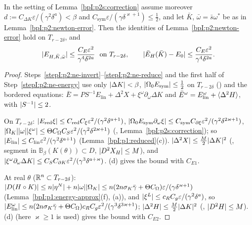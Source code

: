\begin{lemma}\label{bpI:p2s:newton-error}
In the setting of Lemma~\ref{bpI:p2s:correction} assume moreover $d:=C_{\Delta K}\varepsilon/(\gamma^2\delta^a)<\beta$ and
$C_{\mathrm{sym}}\varepsilon/(\gamma\delta^{\varkappa+1})\le\frac12$, and let $\bar K$, $\bar\omega=\bar s\omega^*$ be as in Lemma~\ref{bpI:p2:newton-error}. Then the
identities of Lemma~\ref{bpI:p2:newton-error} hold on $T_{r-2\delta}$, and
\[
\lvert E_{H,\bar K,\bar\omega}\rvert\le\frac{C_E\varepsilon^2}{\gamma^4\delta^{2a}}\ \text{ on }T_{r-2\delta},\qquad\lvert \bar E_H(\bar K)-E_0\rvert\le\frac{C_E\varepsilon^2}{\gamma^4\delta^{2a}}.
\]
\end{lemma}

\begin{proof}
\label{stepI:p2s:ne-id}
Steps~\ref{stepI:p2:ne-invert}--\ref{stepI:p2:ne-reduce} and the first half of Step~\ref{stepI:p2:ne-energy} use only $\lvert \Delta K\rvert<\beta$,
$\lvert \Omega_0E_{\mathrm{sym}}\rvert\le\frac12$ on $T_{r-2\delta}$ () and the bordered equations: $\bar E=PS^{-1}E_{\mathrm{lin}}+\Delta^2X+\xi^\omega
\partial_\omega\Delta K$ and $\bar E^\omega=E^\omega_{\mathrm{lin}}+\langle \Delta^2H\rangle$, with $\lvert S^{-1}\rvert\le2$.

\label{stepI:p2s:ne-e}
On $T_{r-2\delta}$: $\lvert E_{\mathrm{red}}\xi\rvert\le C_{\mathrm{red}}C_\xi\varepsilon^2/(\gamma^2\delta^{a+1})$, $\lvert \Omega_0E_{\mathrm{sym}}\partial_\omega\xi\rvert\le
C_{\mathrm{sym}}C_{\partial\xi}\varepsilon^2/(\gamma^2\delta^{2\varkappa+1})$, $\lvert \Omega_K\rvert\lvert \omega\rvert\lvert \xi^\omega\rvert\le\Theta C_\Omega C_S\varepsilon^2/(\gamma^2\delta^{2\varkappa+1})$
(, Lemma~\ref{bpI:p2s:correction}); so $\lvert E_{\mathrm{lin}}\rvert\le C_{\mathrm{lin}}\varepsilon^2/(\gamma^2\delta^{a+1})$ (Lemma~\ref{bpI:p1:reduced}(c)).
$\lvert \Delta^2X\rvert\le\frac M2\lvert \Delta K\rvert^2$ (, segment in $\mathbb B_\beta(K(\theta))\subset D$, $\lvert D^2X_H\rvert\le M$), and
$\lvert \xi^\omega\partial_\omega\Delta K\rvert\le C_SC_{\partial K}\varepsilon^2/(\gamma^3\delta^{a+\varkappa})$. (d) gives the bound with $C_{E1}$.

\label{stepI:p2s:ne-en}
At real $\theta$ ($\mathbb{R}^n\subset T_{r-2\delta}$): $\lvert D(H\circ K)\rvert\le n\lvert \eta^N\rvert+n\lvert \omega\rvert\lvert \Omega_K\rvert\le n(2n\sigma_K\bar\gamma+\Theta C_\Omega)
\varepsilon/(\gamma\delta^{\varkappa+1})$ (Lemma~\ref{bpI:p1:energy-approx}(f), (a)), and $\lvert \xi^L\rvert\le c_RC_g\varepsilon/(\gamma^2\delta^a)$, so
$\lvert E^\omega_{\mathrm{lin}}\rvert\le n(2n\sigma_K\bar\gamma+\Theta C_\Omega)c_RC_g\varepsilon^2/(\gamma^3\delta^{3\varkappa+1})$; $\lvert \Delta^2H\rvert\le\frac M2\lvert \Delta K\rvert^2$
(, $\lvert D^2H\rvert\le M$). (d) (here $\varkappa\ge1$ is used) gives the bound with $C_{E2}$.
\end{proof}

